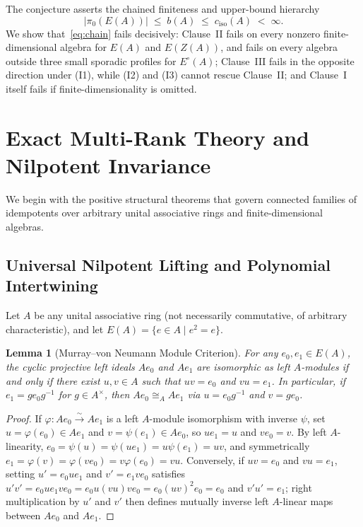 \documentclass[11pt,a4paper]{article}
\newtheorem{lemma}[theorem]{Lemma}
\theoremstyle{definition}
\begin{document}
The conjecture asserts the chained finiteness and upper-bound hierarchy
\begin{equation}\label{eq:chain}
  \bigl|\pi_0(E(A))\bigr| \;\le\; b(A) \;\le\; c_{\mathrm{iso}}(A) \;<\; \infty.
\end{equation}
We show that~\eqref{eq:chain} fails decisively: Clause~II fails on every nonzero
finite-dimensional algebra for $E(A)$ and $E(Z(A))$, and fails on every algebra outside three
small sporadic profiles for $E^\circ(A)$; Clause~III fails in the opposite direction under
(I1), while (I2) and (I3) cannot rescue Clause~II; and Clause~I itself fails if
finite-dimensionality is omitted.

\section{Exact Multi-Rank Theory and Nilpotent Invariance}

We begin with the positive structural theorems that govern connected families of idempotents
over arbitrary unital associative rings and finite-dimensional algebras.

\subsection{Universal Nilpotent Lifting and Polynomial Intertwining}

Let $A$ be any unital associative ring (not necessarily commutative, of arbitrary
characteristic), and let $E(A)=\{e\in A\mid e^2=e\}$.

\begin{lemma}[Murray--von Neumann Module Criterion]\label{lem:mvn}
For any $e_0,e_1\in E(A)$, the cyclic projective left ideals $Ae_0$ and $Ae_1$ are
isomorphic as left $A$-modules if and only if there exist $u,v\in A$ such that $uv=e_0$ and
$vu=e_1$. In particular, if $e_1 = g e_0 g^{-1}$ for $g\in A^\times$, then $Ae_0\cong_A Ae_1$
via $u=e_0 g^{-1}$ and $v=g e_0$.
\end{lemma}

\begin{proof}
If $\varphi : Ae_0 \xrightarrow{\sim} Ae_1$ is a left $A$-module isomorphism with inverse
$\psi$, set $u = \varphi(e_0)\in Ae_1$ and $v = \psi(e_1)\in Ae_0$, so $ue_1 = u$ and
$ve_0 = v$. By left $A$-linearity, $e_0 = \psi(u) = \psi(u e_1) = u\psi(e_1) = uv$, and
symmetrically $e_1 = \varphi(v) = \varphi(v e_0) = v\varphi(e_0) = vu$. Conversely, if
$uv=e_0$ and $vu=e_1$, setting $u'=e_0 u e_1$ and $v'=e_1 v e_0$ satisfies
$u'v' = e_0 u e_1 v e_0 = e_0 u(vu)v e_0 = e_0(uv)^2 e_0 = e_0$ and $v'u'=e_1$; right
multiplication by $u'$ and $v'$ then defines mutually inverse left $A$-linear maps between
$Ae_0$ and $Ae_1$.
\end{proof}
\end{document}
